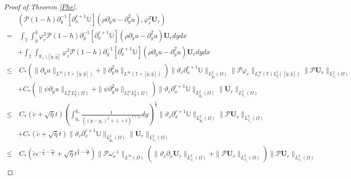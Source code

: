 \documentclass{amsart}
\numberwithin{equation}{section}
\begin{document}
\begin{proof}[Proof of Theorem \ref{Phe}]
\begin{align}\label{JJ121}
&(\mathcal{P}(1-h)\partial_{y}^{-1}[\partial_{x}^{r+1}\mathbb{U}](\rho\partial_{y}u-\partial_{y}^{2}u),\varphi_{r}^{2}\mathbf{U}_{r})\\
=&~\int_{\mathbb{T}}\int_{\check{y}}^{\hat{y}}\varphi_{r}^{2}\mathcal{P}(1-h)\partial_{y}^{-1}[\partial_{x}^{r+1}\mathbb{U}](\rho\partial_{y}u-\partial_{y}^{2}u)\mathbf{U}_{r}dydx\nonumber\\
 &+\int_{\mathbb{T}}\int_{\mathbb{R}_{+}\setminus[\check{y},\hat{y}]}\varphi_{r}^{2}\mathcal{P}(1-h)\partial_{y}^{-1}[\partial_{x}^{r+1}\mathbb{U}](\rho\partial_{y}u-\partial_{y}^{2}u)\mathbf{U}_{r}dydx\nonumber\\
\leq&~C_{*}\left(\|\partial_{y}u\|_{L^{\infty}(\mathbb{T}\times[\check{y},\hat{y}])}
                 +\|\partial_{y}^{2}u\|_{L^{\infty}(\mathbb{T}\times[\check{y},\hat{y}])}\right)
          \|\vartheta_{c}\partial_{x}^{r+1}\mathbb{U}\|_{L_{\hat{\Psi}_{c}}^{2}(\Omega)}
          \|\mathcal{P}\varphi_{r}\|_{L_{x}^{\infty}(\mathbb{T})L_{y}^{2}([\check{y},\hat{y}])}
          \|\mathcal{P}\mathbf{U}_{r}\|_{L_{\varphi_{r}}^{2}(\Omega)}\nonumber\\
    &+C_{*}\left(\|\psi\partial_{y}u\|_{L_{x}^{\infty}L_{y}^{2}(\Omega)}+\|\psi\partial_{y}^{2}u\|_{L_{x}^{\infty}L_{y}^{2}(\Omega)}\right)
          \|\vartheta_{c}\partial_{x}^{r+1}\mathbb{U}\|_{L_{\hat{\Psi}_{r}}^{2}(\Omega)}\|\mathbf{U}_{r}\|_{L_{\varphi_{r}}^{2}(\Omega)}\nonumber\\
\leq&~C_{*}(\check{c}+\sqrt{\bar{\eta}}t)
          \left(\int_{\check{y}_{*}}^{\hat{y}_{*}}\frac{1}{((y-y_{*})^2+\bar{\varsigma}+t)^{1+\varepsilon_{0}}}dy\right)^{\frac{1}{2}}
          \|\vartheta_{c}\partial_{x}^{r+1}\mathbb{U}\|_{L_{\hat{\Psi}_{c}}^{2}(\Omega)}
          \|\mathcal{P}\mathbf{U}_{r}\|_{L_{\varphi_{r}}^{2}(\Omega)}\nonumber\\
    &+C_{*}(\check{c}+\sqrt{\bar{\eta}}t)\|\vartheta_{c}\partial_{x}^{r+1}\mathbb{U}\|_{L_{\hat{\Psi}_{r}}^{2}(\Omega)}
          \|\mathbf{U}_{r}\|_{L_{\varphi_{r}}^{2}(\Omega)}\nonumber\\
\leq&~C_{*}(\check{c}\iota^{-\frac{1}{4}-\frac{\varepsilon_{0}}{2}}+\sqrt{\bar{\eta}}t^{\frac{3}{4}-\frac{\varepsilon_{0}}{2}})
           \|\mathcal{P}\omega_{o}^{-1}\|_{L^{\infty}(\Omega)}
           \left(\|\vartheta_{c}\partial_{x}\mathbf{U}_{r}\|_{L_{\varphi_{r}}^{2}(\Omega)}
                 +\|\mathcal{P}\mathbf{U}_{r}\|_{L_{\varphi_{r}}^{2}(\Omega)}\right)
          \|\mathcal{P}\mathbf{U}_{r}\|_{L_{\varphi_{r}}^{2}(\Omega)}\nonumber\\

\end{align}
\end{proof}
\end{document}
